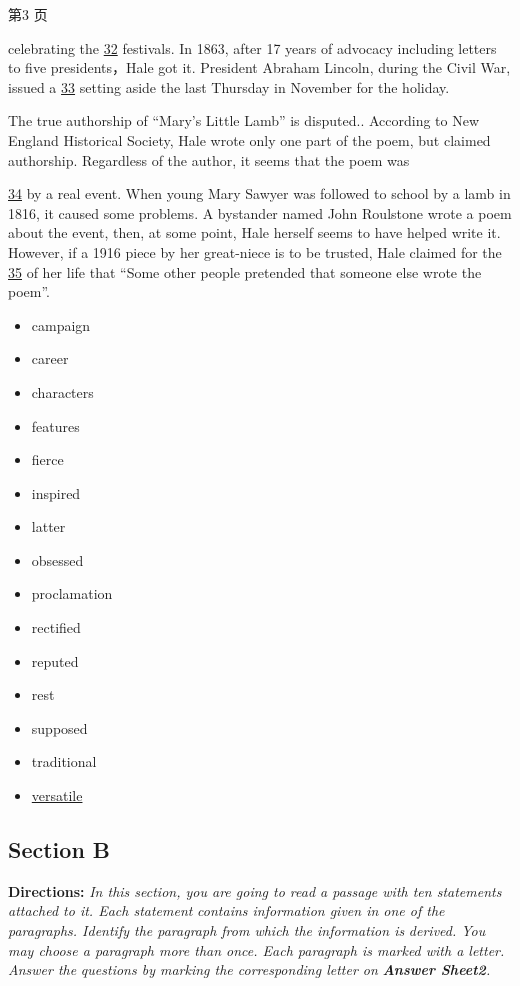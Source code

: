 \documentclass[UTF8,11pt]{ctexart}
\begin{document}
第3 页


celebrating the \uline{32} festivals. In 1863, after 17 years of advocacy including letters to five presidents，Hale got it. President Abraham Lincoln, during the Civil War, issued a \uline{33} setting aside the last Thursday in November for the holiday.


The true authorship of “Mary’s Little Lamb” is disputed.. According to New England Historical Society, Hale wrote only one part of the poem, but claimed authorship. Regardless of the author, it seems that the poem was


\uline{34} by a real event. When young Mary Sawyer was followed to school by a lamb in 1816, it caused some problems. A bystander named John Roulstone wrote a poem about the event, then, at some point, Hale herself seems to have helped write it. However, if a 1916 piece by her great-niece is to be trusted, Hale claimed for the \uline{35} of her life that “Some other people pretended that someone else wrote the poem”.


\begin{itemize}[leftmargin=2em,itemsep=.2em,topsep=.4em]\item[A.] campaign
\item[B.] career
\item[C.] characters
\item[D.] features
\item[E.] fierce
\item[F.] inspired
\item[G.] latter
\item[H.] obsessed
\item[I.] proclamation
\item[J.] rectified
\item[K.] reputed
\item[L.] rest
\item[M.] supposed
\item[N.] traditional
\item[O.] \uline{versatile}
\end{itemize}

\subsection*{\textbf{Section B}}


\textbf{Directions:}\textit{ In this section, you are going to read a passage with ten statements attached to it. Each statement} \textit{contains information given in one of the paragraphs. Identify the paragraph from which the information is} \textit{derived. You may choose a paragraph more than once. Each paragraph is marked with a letter. Answer the} \textit{questions by marking the corresponding letter on}\textbf{\textit{ Answer Sheet2}}\textit{.}
\end{document}
